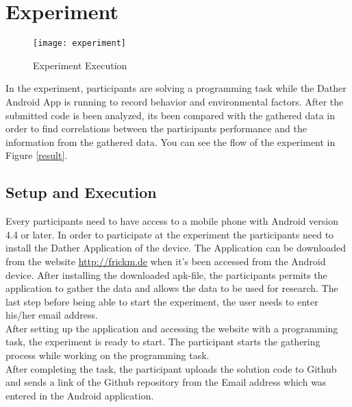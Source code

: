 \chapter{Experiment}


\begin{figure}
\texttt{[image: experiment]}
\caption{Experiment Execution}\label{experiment}
\vspace{10 mm}
\end{figure}

In the experiment, participants are solving a programming task while the Dather Android App is running to record behavior and environmental factors. After the submitted code is been analyzed, its been compared with the gathered data in order to find correlations between the participants performance and the information from the gathered data. You can see the flow of the experiment in Figure \ref{result}. 
\section{Setup and Execution}
Every participants need to have access to a mobile phone with Android version 4.4 or later. In order to participate at the experiment the participants need to install the Dather Application of the device. The Application can be downloaded from the website \url{http://frickm.de} when it's been accessed from the Android device. 
After installing the downloaded apk-file, the participants permits the application to gather the data and allows the data to be used for research. 
The last step before being able to start the experiment, the user needs to enter his/her email address.\\
After setting up the application and accessing the website with a programming task, the experiment is ready to start. The participant starts the gathering process while working on the programming task.\\
After completing the task, the participant uploads the solution code to Github and sends a link of the Github repository from the Email address which was entered in the Android application. 

